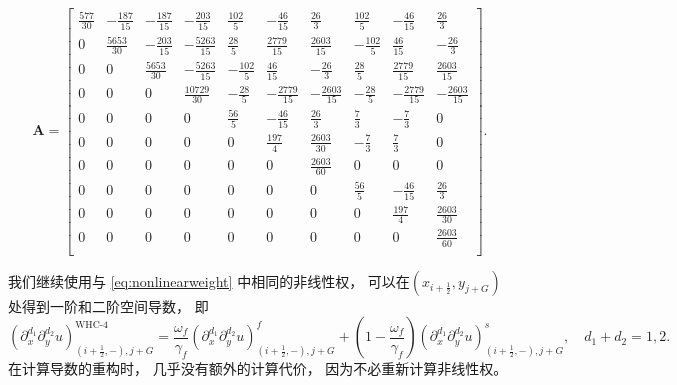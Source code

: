 \begin{equation}
  \bm A =
  \begin{bmatrix}
    \frac{577}{30} & -\frac{187}{15} & -\frac{187}{15} & -\frac{203}{15}  & \frac{102}{5}  & -\frac{46}{15}   & \frac{26}{3}     & \frac{102}{5}  & -\frac{46}{15}   & \frac{26}{3}     \\
    0              & \frac{5653}{30} & -\frac{203}{15} & -\frac{5263}{15} & \frac{28}{5}   & \frac{2779}{15}  & \frac{2603}{15}  & -\frac{102}{5} & \frac{46}{15}    & -\frac{26}{3}    \\
    0              & 0               & \frac{5653}{30} & -\frac{5263}{15} & -\frac{102}{5} & \frac{46}{15}    & -\frac{26}{3}    & \frac{28}{5}   & \frac{2779}{15}  & \frac{2603}{15}  \\
    0              & 0               & 0               & \frac{10729}{30} & -\frac{28}{5}  & -\frac{2779}{15} & -\frac{2603}{15} & -\frac{28}{5}  & -\frac{2779}{15} & -\frac{2603}{15} \\
    0              & 0               & 0               & 0                & \frac{56}{5}   & -\frac{46}{15}   & \frac{26}{3}     & \frac{7}{3}    & -\frac{7}{3}     & 0                \\
    0              & 0               & 0               & 0                & 0              & \frac{197}{4}    & \frac{2603}{30}  & -\frac{7}{3}   & \frac{7}{3}      & 0                \\
    0              & 0               & 0               & 0                & 0              & 0                & \frac{2603}{60}  & 0              & 0                & 0                \\
    0              & 0               & 0               & 0                & 0              & 0                & 0                & \frac{56}{5}   & -\frac{46}{15}   & \frac{26}{3}     \\
    0              & 0               & 0               & 0                & 0              & 0                & 0                & 0              & \frac{197}{4}    & \frac{2603}{30}  \\
    0              & 0               & 0               & 0                & 0              & 0                & 0                & 0              & 0                & \frac{2603}{60}  \\
  \end{bmatrix}.
\end{equation}

我们继续使用与 \cref{eq:nonlinearweight} 中相同的非线性权，
可以在$(x_{i+\frac{1}{2}},y_{j+G})$处得到一阶和二阶空间导数，
即
\begin{equation}
  \left({\partial_{x}^{d_1}}{\partial_{y}^{d_2}}u\right)_{(i+\frac{1}{2},-), j+G}^{\text{WHC-4}}= \frac{\omega_{{f}}}{\gamma_{{f}}}\left({\partial_{x}^{d_1}}{\partial_{y}^{d_2}}u\right)_{(i+\frac{1}{2},-), j+G}^{{f}}+ \left(1-\frac{\omega_{{f}}}{\gamma_{{f}}}\right)\left({\partial_{x}^{d_1}}{\partial_{y}^{d_2}}u\right)_{(i+\frac{1}{2},-), j+G}^{{s}}, \quad d_1+d_2=1,2.
\end{equation}
在计算导数的重构时，
几乎没有额外的计算代价，
因为不必重新计算非线性权。

